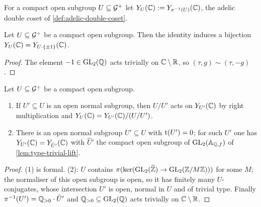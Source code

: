 \begin{definition}
\label{def:modular-curve-of-U}
For a compact open subgroup $U \subseteq \mathcal{G}^{+}$ let
$Y_{U}(\mathbb{C}) := Y_{\pi^{-1}(U)}(\mathbb{C})$,
the adelic double coset of \cref{def:adelic-double-coset}.
\end{definition}

\begin{lemma}\label{lem:minus-one-trivial}
Let $U \subseteq \mathcal{G}^{+}$ be a compact open subgroup. Then the
identity induces a bijection
$Y_{U}(\mathbb{C}) = Y_{U\cdot\{\pm 1\}}(\mathbb{C})$.
\end{lemma}

\begin{proof}
The element $-1 \in \GL{2}{\QQ}$ acts trivially on $\mathbb{C}\setminus\mathbb{R}$, so
$(\tau, g) \sim (\tau, -g)$.
\end{proof}

\begin{lemma}\label{lem:finite-quotients}
Let $U \subseteq \mathcal{G}^{+}$ be a compact open subgroup.
\begin{enumerate}
\item If $U' \subseteq U$ is an open normal subgroup, then $U/U'$ acts on
  $Y_{U'}(\mathbb{C})$ by right multiplication and
  $Y_{U}(\mathbb{C}) = Y_{U'}(\mathbb{C})/(U/U')$.
\item There is an open normal subgroup $U' \subseteq U$ with
  $\mathrm{t}(U') = 0$; for such $U'$ one has
  $Y_{U'}(\mathbb{C}) = Y_{\hat U'}(\mathbb{C})$ with $\hat U'$ the
  compact open subgroup of $\GL{2}{\FiniteAdeles{\QQ}}$ of
  \cref{lem:type-trivial-lift}.
\end{enumerate}
\end{lemma}

\begin{proof}
(1) is formal. (2): $U$ contains $\AdelicProjection(\ker(\GL{2}{\ProfiniteIntegers}
\to \GL{2}{\ResidueRing{M}}))$ for some $M$; the normaliser of this open
subgroup is open, so it has finitely many $U$-conjugates, whose
intersection $U'$ is open, normal in $U$ and of trivial type. Finally
$\pi^{-1}(U') = \mathbb{Q}_{>0}\cdot\hat U'$ and
$\PositiveRationals \subseteq \GL{2}{\QQ}$ acts trivially on $\mathbb{C}\setminus\mathbb{R}$.
\end{proof}

